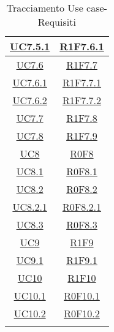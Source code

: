 \begin{longtable}{|c|c|}
\hline
\hyperlink{UC7.5.1}{UC7.5.1} & \hyperlink{R1F7.6.1}{R1F7.6.1}\\
\hline
\hyperlink{UC7.6}{UC7.6} & \hyperlink{R1F7.7}{R1F7.7}\\
\hline
\hyperlink{UC7.6.1}{UC7.6.1} & \hyperlink{R1F7.7.1}{R1F7.7.1}\\
\hline
\hyperlink{UC7.6.2}{UC7.6.2} & \hyperlink{R1F7.7.2}{R1F7.7.2}\\
\hline
\hyperlink{UC7.7}{UC7.7} & \hyperlink{R1F7.8}{R1F7.8}\\
\hline
\hyperlink{UC7.8}{UC7.8} & \hyperlink{R1F7.9}{R1F7.9}\\
\hline
\hyperlink{UC8}{UC8} & \hyperlink{R0F8}{R0F8}\\
\hline
\hyperlink{UC8.1}{UC8.1} & \hyperlink{R0F8.1}{R0F8.1}\\
\hline
\hyperlink{UC8.2}{UC8.2} & \hyperlink{R0F8.2}{R0F8.2}\\
\hline
\hyperlink{UC8.2.1}{UC8.2.1} & \hyperlink{R0F8.2.1}{R0F8.2.1}\\
\hline
\hyperlink{UC8.3}{UC8.3} & \hyperlink{R0F8.3}{R0F8.3}\\
\hline
\hyperlink{UC9}{UC9} & \hyperlink{R1F9}{R1F9}\\
\hline
\hyperlink{UC9.1}{UC9.1} & \hyperlink{R1F9.1}{R1F9.1}\\
\hline
\hyperlink{UC10}{UC10} & \hyperlink{R1F10}{R1F10}\\
\hline
\hyperlink{UC10.1}{UC10.1} & \hyperlink{R0F10.1}{R0F10.1}\\
\hline
\hyperlink{UC10.2}{UC10.2} & \hyperlink{R0F10.2}{R0F10.2}\\
\hline
\caption[Tracciamento Use case-Requisiti]{Tracciamento Use case-Requisiti}
\label{tabella:requi-usecase}
\end{longtable}
\clearpage
